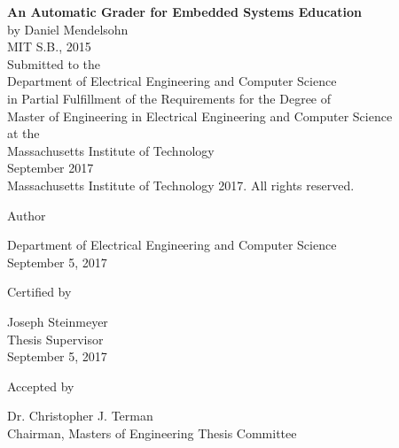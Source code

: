 \documentclass[12pt]{article}
\newcommand{\mytitle}{\textbf{An Automatic Grader for Embedded Systems Education}}
\newcommand{\mydate}{September 5, 2017}
\begin{document}
\begin{titlepage}

\centering
\mytitle \\
\vspace{12pt}
by Daniel Mendelsohn \\
MIT S.B., 2015 \\
\vspace{12pt}
Submitted to the \\
Department of Electrical Engineering and Computer Science \\
in Partial Fulfillment of the Requirements for the Degree of \\
\vspace{12pt}
Master of Engineering in Electrical Engineering and Computer Science \\
\vspace{12pt}
at the \\
\vspace{12pt}
Massachusetts Institute of Technology \\
\vspace{12pt}
September 2017 \\
\vspace{12pt}
\textcopyright \hspace{0.05in} Massachusetts Institute of Technology 2017.  All rights reserved. \\
\vspace{48pt}

Author \dotfill \\
\begin{flushright}
Department of Electrical Engineering and Computer Science \\
\mydate
\end{flushright}
\vspace{36pt}

Certified by \dotfill \\
\begin{flushright}
Joseph Steinmeyer \\
Thesis Supervisor \\
\mydate
\end{flushright}
\vspace{24pt}

Accepted by \dotfill \\
\begin{flushright}
Dr. Christopher J. Terman \\
Chairman, Masters of Engineering Thesis Committee
\end{flushright}

\end{titlepage}
\end{document}
